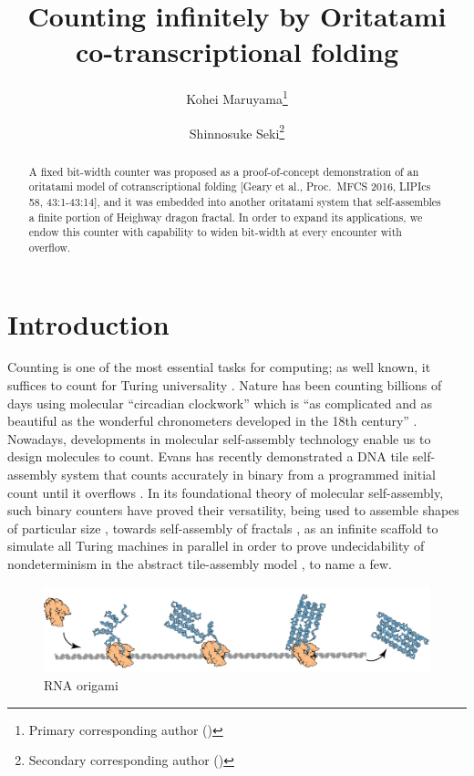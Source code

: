 \documentclass[runningheads]{llncs}
\title{Counting infinitely by Oritatami co-transcriptional folding}
\author{
Kohei Maruyama\inst{1}\thanks{Primary corresponding author (\email{k.maruyama@uec.ac.jp})} \and
Shinnosuke Seki\inst{1,2}\thanks{Secondary corresponding author (\email{s.seki@uec.ac.jp})}
}
\institute{
The University of Electro-Communications, 
1-5-1 Chofugaoka, Chofu, Tokyo, 1828585, Japan \and
\'{E}cole Normale Superi\'{e}ure de Lyon, 46 all\'{e}e d'Italie, 69007, Lyon, France
}
\begin{document}
\maketitle

\begin{abstract}
A fixed bit-width counter was proposed as a proof-of-concept demonstration of an oritatami model of cotranscriptional folding [Geary et al., Proc.~MFCS 2016, LIPIcs 58, 43:1-43:14], and it was embedded into another oritatami system that self-assembles a finite portion of Heighway dragon fractal. 
In order to expand its applications, we endow this counter with capability to widen bit-width at every encounter with overflow. 
\end{abstract}

	\section{Introduction}

Counting is one of the most essential tasks for computing; as well known, it suffices to count for Turing universality \cite{Minsky1967}. 
Nature has been counting billions of days using molecular ``circadian clockwork'' which is ``as complicated and as beautiful as the wonderful chronometers developed in the 18th century''  \cite{McClung2006}. 
Nowadays, developments in molecular self-assembly technology enable us to design molecules to count. 
Evans has recently demonstrated a DNA tile self-assembly system that counts accurately in binary from a programmed initial count until it overflows \cite{EvansPhD}. 
In its foundational theory of molecular self-assembly, such binary counters have proved their versatility, being used to assemble shapes of particular size \cite{AdChGoHu2001,RothemundWinfree2000}, towards self-assembly of fractals \cite{MasudaSekiUbukata2018}, as an infinite scaffold to simulate all Turing machines in parallel in order to prove undecidability of nondeterminism in the abstract tile-assembly model \cite{BrChDoKaSe2013}, to name a few. 

\begin{figure}[tb]
\centering
\includegraphics[width=\linewidth]{fig/rna_origami.pdf}
\caption{RNA origami}
\label{fig:rna_origami}
\end{figure}
\end{document}

